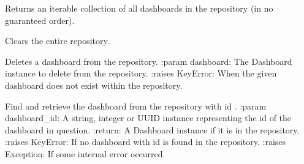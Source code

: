 \documentclass[letterpaper,10pt,english]{sphinxmanual}
\begin{document}

\begin{fulllineitems}
\label{\detokenize{pydash_app.dashboard.repository:pydash_app.dashboard.repository.all}}
Returns an iterable collection of all dashboards in the repository (in no guaranteed order).

\end{fulllineitems}


\begin{fulllineitems}
\label{\detokenize{pydash_app.dashboard.repository:pydash_app.dashboard.repository.clear_all}}
Clears the entire repository.

\end{fulllineitems}


\begin{fulllineitems}
\label{\detokenize{pydash_app.dashboard.repository:pydash_app.dashboard.repository.delete}}
Deletes a dashboard from the repository.
:param dashboard: The Dashboard instance to delete from the repository.
:raises KeyError: When the given dashboard does not exist within the repository.

\end{fulllineitems}


\begin{fulllineitems}
\label{\detokenize{pydash_app.dashboard.repository:pydash_app.dashboard.repository.find}}
Find and retrieve the dashboard from the repository with id .
:param dashboard\_id: A string, integer or UUID instance representing the id of the dashboard in question.
:return: A Dashboard instance if it is in the repository.
:raises KeyError: If no dashboard with id  is found in the repository.
:raises Exception: If some internal error occurred.

\end{fulllineitems}
\end{document}
